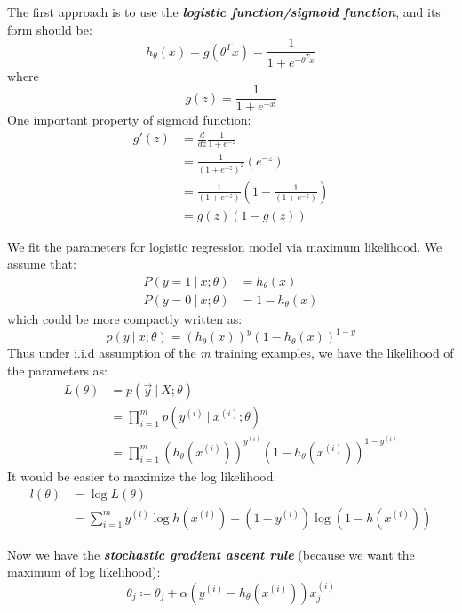 \documentclass{article}
\begin{document}
The first approach is to use the \emph{\textbf{logistic function/sigmoid function}}, and its form should be:
\begin{equation*}
h_\theta(x)=g(\theta^Tx)=\frac{1}{1+e^{-\theta^Tx}}
\end{equation*}
where
\begin{equation*}
g(z)=\frac{1}{1+e^{-x}}
\end{equation*}
One important property of sigmoid function:
\begin{align*}
g'(z) &= \frac{d}{dz}\frac{1}{1+e^{-z}} \\
      &= \frac{1}{{(1+e^{-z})}^2}(e^{-z}) \\
      &= \frac{1}{(1+e^{-z})}\left(1-\frac{1}{(1+e^{-z})}\right) \\
      &= g(z)(1-g(z))
\end{align*}

We fit the parameters for logistic regression model via maximum likelihood.
We assume that:
\begin{align*}
P(y=1\ |\ x;\theta) &= h_\theta(x) \\
P(y=0\ |\ x;\theta) &= 1 - h_\theta(x)
\end{align*}
which could be more compactly written as:
\begin{equation*}
p(y\ |\ x;\theta) = (h_\theta(x))^y(1-h_\theta(x))^{1-y}
\end{equation*}
Thus under i.i.d assumption of the \emph{m} training examples, we have the likelihood of the parameters as:
\begin{align*}
L(\theta) &= p(\vec{y}\ |\ X;\theta) \\
          &= \prod\limits_{i=1}^mp(y^{(i)}\ |\ x^{(i)};\theta) \\
          &= \prod\limits_{i=1}^m\left(h_\theta(x^{(i)})\right)^{y^{(i)}}\left(1-h_\theta(x^{(i)})\right)^{1-y^{(i)}}
\end{align*}
It would be easier to maximize the log likelihood:
\begin{align*}
l(\theta) &= \log L(\theta) \\
          &= \sum\limits_{i=1}^my^{(i)}\log h(x^{(i)}) + (1-y^{(i)}) \log(1-h(x^{(i)}))
\end{align*}

Now we have the \emph{\textbf{stochastic gradient ascent rule}} (because we want the maximum of log likelihood):
\begin{equation*}
\theta_j\coloneqq\theta_j + \alpha(y^{(i)}-h_\theta(x^{(i)}))x_j^{(i)}
\end{equation*}
\end{document}
